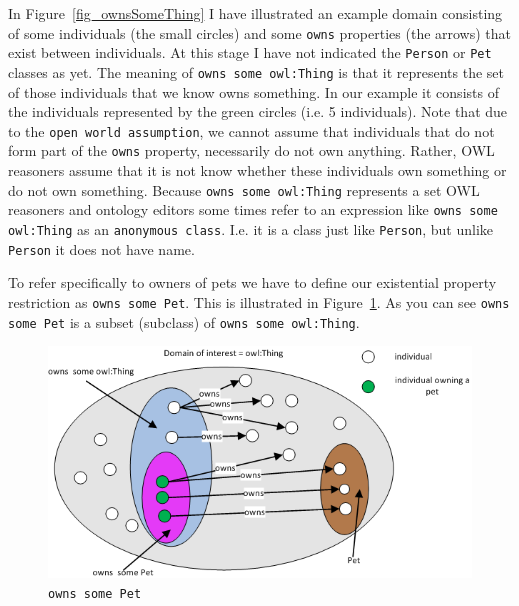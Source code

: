 \documentclass{amsart}
\begin{document}
  In Figure~\ref{fig_ownsSomeThing} I have illustrated an example domain consisting of some individuals (the small circles) and some \texttt{owns} properties (the arrows) that exist between individuals. At this stage I have not indicated the \texttt{Person} or \texttt{Pet} classes as yet. The meaning of \texttt{owns some owl:Thing} is that it represents the set of those individuals that we know owns something. In our example it consists of the individuals represented by the green circles (i.e. 5 individuals). Note that due to the \texttt{open world assumption}, we cannot assume that individuals that do not form part of the \texttt{owns} property, necessarily do not own anything. Rather, OWL reasoners assume that it is not know whether these individuals own something or do not own something. Because \texttt{owns some owl:Thing} represents a set OWL reasoners and ontology editors some times refer to an expression like \texttt{owns some owl:Thing} as an \texttt{anonymous class}. I.e. it is a class just like \texttt{Person}, but unlike \texttt{Person} it does not have name.
  
  
  To refer specifically to owners of pets we have to define our existential property restriction as \texttt{owns some Pet}. This is illustrated in Figure~\ref{fig_ownsSomePet}. As you can see \texttt{owns some Pet} is a subset (subclass) of \texttt{owns some owl:Thing}. 
  
    \begin{figure}
      \centering \includegraphics[trim = 0mm 0mm 0mm 0mm, clip, scale=1]{./ownsSomePet.png}
      \caption{\texttt{owns some Pet}}\label{fig_ownsSomePet}
    \end{figure}    
  
\end{document}
